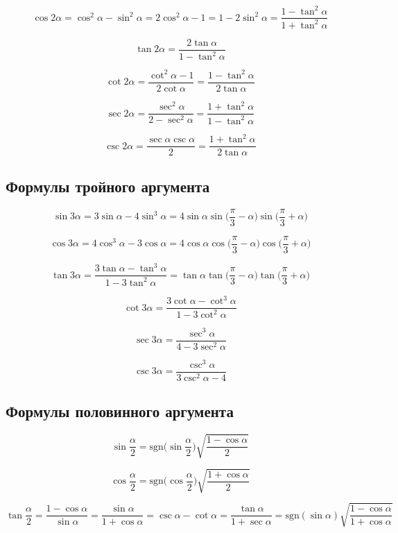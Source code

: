 \documentclass[
  letterpaper,
  DIV=11,
  numbers=noendperiod]{scrreprt}
\theoremstyle{definition}
\theoremstyle{remark}
\begin{document}
\[
\cos 2\alpha = \cos^2 \alpha - \sin^2 \alpha = 2\cos^2 \alpha - 1 = 1 - 2\sin^2 \alpha = \frac{1 - \tan^2 \alpha}{1 + \tan^2 \alpha}
\]

\[
\tan 2\alpha = \frac{2\tan \alpha}{1 - \tan^2 \alpha}
\]

\[
\cot 2\alpha = \frac{\cot^2 \alpha - 1}{2 \cot \alpha} = \frac{1 - \tan^2 \alpha}{2 \tan \alpha}
\]

\[
\sec 2\alpha = \frac{\sec^2 \alpha}{2 - \sec^2 \alpha} = \frac{1 + \tan^2 \alpha}{1 - \tan^2 \alpha}
\]

\[
\csc 2\alpha = \frac{\sec \alpha \csc \alpha}{2} = \frac{1 + \tan^2 \alpha}{2 \tan \alpha}
\]

\subsection{Формулы тройного аргумента}\label{trig_triple_arg}

\[
\sin 3\alpha = 3\sin \alpha - 4 \sin^3 \alpha = 4\sin \alpha \sin \Big( \frac{\pi}{3} - \alpha\Big) \sin \Big( \frac{\pi}{3} + \alpha \Big)
\]

\[
\cos 3\alpha = 4\cos^3 \alpha - 3 \cos \alpha = 4\cos \alpha \cos \Big(\frac{\pi}{3} - \alpha\Big) \cos \Big(\frac{\pi}{3} + \alpha\Big)
\]

\[
\tan 3\alpha = \frac{3\tan \alpha - \tan^3 \alpha}{1 - 3\tan^2 \alpha} = \tan \alpha \tan \Big( \frac{\pi}{3} - \alpha \Big) \tan \Big(\frac{\pi}{3} + \alpha \Big)
\]

\[
\cot 3\alpha = \frac{3 \cot \alpha - \cot^3 \alpha}{1 - 3\cot^2 \alpha}
\]

\[
\sec 3\alpha = \frac{\sec^3 \alpha}{4 - 3\sec^2 \alpha}
\]

\[
\csc 3\alpha = \frac{\csc^3 \alpha}{3\csc^2 \alpha -4}
\]

\subsection{Формулы половинного аргумента}\label{trig_half_arg}

\[
\sin \frac{\alpha}{2} = \text{sgn}\Big(\sin \frac{\alpha}{2} \Big) \sqrt{\frac{1 - \cos \alpha}{2}}
\]

\[
\cos \frac{\alpha}{2} = \text{sgn}\Big( \cos \frac{\alpha}{2} \Big) \sqrt{\frac{1 + \cos \alpha}{2}}
\]

\[
\tan \frac{\alpha}{2} = \frac{1 - \cos\alpha}{\sin \alpha} = \frac{\sin \alpha}{1 + \cos \alpha} = \csc \alpha - \cot \alpha = \frac{\tan \alpha}{1 + \sec \alpha} = \text{sgn}(\sin \alpha) \sqrt{\frac{1 - \cos \alpha}{1 + \cos \alpha}}
\]
\end{document}
